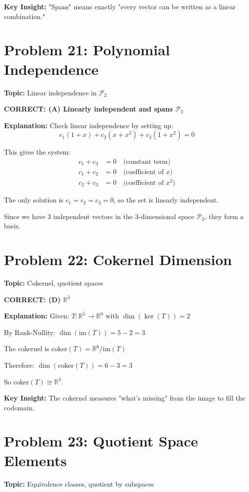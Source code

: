 \documentclass[12pt]{amsart}
\newcommand{\correct}[1]{{\color{blue}\textbf{CORRECT: #1}}}
\newcommand{\hint}{\textbf{Key Insight: }}
\begin{document}
\hint "Spans" means exactly "every vector can be written as a linear combination."

\hrulefill

\section*{Problem 21: Polynomial Independence}
\textbf{Topic:} Linear independence in $\mathcal{P}_2$

\correct{(A) Linearly independent and spans $\mathcal{P}_2$}

\textbf{Explanation:} Check linear independence by setting up:
$$c_1(1+x) + c_2(x+x^2) + c_3(1+x^2) = 0$$

This gives the system:
\begin{align}
c_1 + c_3 &= 0 \quad \text{(constant term)}\\
c_1 + c_2 &= 0 \quad \text{(coefficient of } x\text{)}\\
c_2 + c_3 &= 0 \quad \text{(coefficient of } x^2\text{)}
\end{align}

The only solution is $c_1 = c_2 = c_3 = 0$, so the set is linearly independent.

Since we have 3 independent vectors in the 3-dimensional space $\mathcal{P}_2$, they form a basis.

\hrulefill

\section*{Problem 22: Cokernel Dimension}
\textbf{Topic:} Cokernel, quotient spaces

\correct{(D) $\mathbb{R}^3$}

\textbf{Explanation:} 
Given: $T: \mathbb{R}^5 \to \mathbb{R}^6$ with $\dim(\ker(T)) = 2$

By Rank-Nullity: $\dim(\text{im}(T)) = 5 - 2 = 3$

The cokernel is $\text{coker}(T) = \mathbb{R}^6/\text{im}(T)$

Therefore: $\dim(\text{coker}(T)) = 6 - 3 = 3$

So coker$(T) \cong \mathbb{R}^3$.

\hint The cokernel measures "what's missing" from the image to fill the codomain.

\hrulefill

\section*{Problem 23: Quotient Space Elements}
\textbf{Topic:} Equivalence classes, quotient by subspaces
\end{document}
